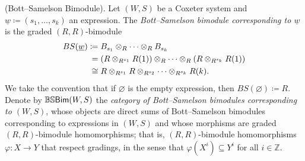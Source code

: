 \noindent\begin{definition}\textup{(Bott--Samelson Bimodule).} Let $(W, S)$ be a Coxeter system and $\underline{w} \coloneqq (s_1, \dots, s_k)$ an expression. The {\em Bott--Samelson bimodule corresponding to $\underline{w}$} is the graded $(R, R)$-bimodule
\begin{align*}
\begin{split}
BS(\underline{w}) &\coloneqq B_{s_1} \otimes_R \cdots \otimes_R B_{s_k}\\
&\hphantom{\coloneqq}\nhphantom{=}= (R \otimes_{R^{s_1}} R(1)) \otimes_R \cdots \otimes_R (R \otimes_{R^{s_k}} R(1))\\
&\hphantom{\coloneqq}\nhphantom{$\cong$}\cong R \otimes_{R^{s_1}} R \otimes_{R^{s_2}} \cdots \otimes_{R^{s_k}} R(k).
\end{split}
\end{align*}
\noindent We take the convention that if $\varnothing$ is the empty expression, then $BS(\varnothing) \coloneqq R$. Denote by $\mathbb{BS}\textnormal{\textsf{Bim}}(W, S)$ the {\em category of Bott--Samelson bimodules corresponding to $(W, S)$}, whose objects are direct sums of Bott--Samelson bimodules corresponding to expressions in $(W, S)$ and whose morphisms are graded $(R, R)$-bimodule homomorphisms; that is, $(R, R)$-bimodule homomorphisms $\varphi : X \to Y$ that respect gradings, in the sense that $\varphi(X^i) \subseteq Y^i$ for all $i \in \mathbb{Z}$.\\
\end{definition}


